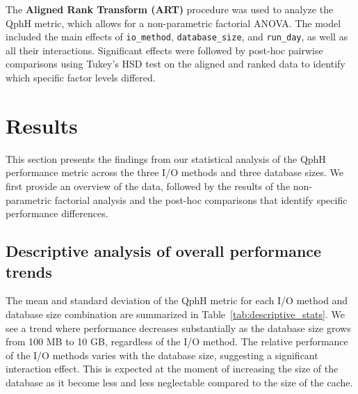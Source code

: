 \documentclass[conference]{IEEEtran}
\begin{document}
The \textbf{Aligned Rank Transform (ART)} procedure was used to analyze the QphH metric, which allows for a non-parametric factorial ANOVA. The model included the main effects of \texttt{io\_method}, \texttt{database\_size}, and \texttt{run\_day}, as well as all their interactions. Significant effects were followed by post-hoc pairwise comparisons using Tukey's HSD test on the aligned and ranked data to identify which specific factor levels differed.



\section{Results}
\label{sec:Results}

This section presents the findings from our statistical analysis of the QphH performance metric across the three I/O methods and three database sizes. We first provide an overview of the data, followed by the results of the non-parametric factorial analysis and the post-hoc comparisons that identify specific performance differences.

\subsection{Descriptive analysis of overall performance trends}

The mean and standard deviation of the QphH metric for each I/O method and database size combination are summarized in Table~\ref{tab:descriptive_stats}. We see a trend where performance decreases substantially as the database size grows from 100 MB to 10 GB, regardless of the I/O method. The relative performance of the I/O methods varies with the database size, suggesting a significant interaction effect. This is expected at the moment of increasing the size of the database as it become less and less neglectable compared to the size of the cache.

\begin{table}[b]
\centering
\caption{Mean and Standard Deviation of QphH Metric by I/O Method and Database Size}
\label{tab:descriptive_stats}
\end{table}
\end{document}

